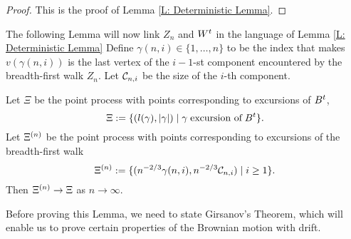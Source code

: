 \begin{proof}
	This is the proof of Lemma \ref{L: Deterministic Lemma}. 
\end{proof}


The following Lemma will now link $Z_n$ and $W^t$ in the language of Lemma \ref{L: Deterministic Lemma}
Define $\gamma (n, i) \in \{1, \dots, n\}$ to be the index that makes
$v(\gamma(n,i))$ is the last vertex of the $i-1$-st component encountered by the breadth-first walk $Z_n$.
Let $\mathcal{C}_{n,i}$ be the size of the $i$-th component.

\begin{lemma} \label{L: Lemma 8}
	Let $\Xi$ be the point process with points corresponding to excursions of $B^t$,
	\begin{equation}
	\Xi := \{ (l(\gamma), |\gamma|) \; | \; \gamma \; \text{excursion of} \; B^t \}.
	\end{equation}
	Let $\Xi^{(n)}$ be the point process with points corresponding to excursions of the breadth-first walk
	\begin{equation}
	\Xi^{(n)} := \{ ( n^{-2 / 3} \gamma(n,i), n^{-2 / 3} \mathcal{C}_{n,i} ) \; | \; i \geq 1 \}.
	\end{equation}
	Then $\Xi^{(n)} \rightarrow \Xi$ as $n \rightarrow \infty$.
\end{lemma}

Before proving this Lemma, we need to state Girsanov's Theorem, 
which will enable us to prove certain properties of the Brownian motion with drift.

